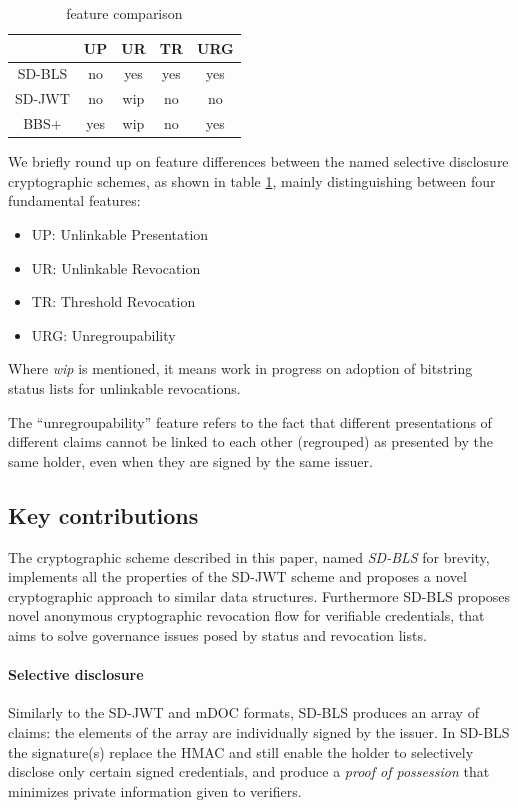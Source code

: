 \begin{table}[]
\centering
\renewcommand{\arraystretch}{2}
\begin{tabular}{ccccc}
\hline
       & \textbf{UP} & \textbf{UR} & \textbf{TR} & \textbf{URG} \\ \hline
SD-BLS & no          & yes         & yes         & yes \\ \hline
SD-JWT & no          & wip         & no          & no  \\ \hline
BBS+   & yes         & wip         & no          & yes \\ \hline
\end{tabular}
\vspace*{5mm}
\caption{feature comparison}
\label{tab:features}
\end{table}

We briefly round up on feature differences between the named selective
disclosure cryptographic schemes, as shown in table
\ref{tab:features}, mainly distinguishing between four fundamental
features:
\begin{itemize}
\item UP: Unlinkable Presentation
\item UR: Unlinkable Revocation
\item TR: Threshold Revocation
\item URG: Unregroupability
\end{itemize}

Where \emph{wip} is mentioned, it means work in progress on adoption of
bitstring status lists for unlinkable revocations.

The ``unregroupability'' feature refers to the fact that different
presentations of different claims cannot be linked to each other
(regrouped) as presented by the same holder, even when they are signed
by the same issuer.

\subsection{Key contributions}
The cryptographic scheme described in this paper, named
\textit{SD-BLS} for brevity, implements all the properties of the
SD-JWT scheme and proposes a novel cryptographic approach to similar
data structures. Furthermore SD-BLS proposes novel anonymous
cryptographic revocation flow for verifiable credentials, that aims to
solve governance issues posed by status and revocation lists.

\paragraph{Selective disclosure}
Similarly to the SD-JWT and mDOC formats, SD-BLS produces an array of
claims: the elements of the array are individually signed by the
issuer. In SD-BLS the signature(s) replace the HMAC and still enable
the holder to selectively disclose only certain signed credentials,
and produce a \textit{proof of possession} that minimizes private
information given to verifiers.


